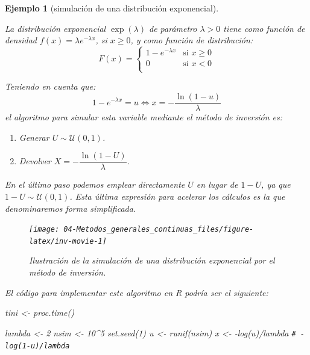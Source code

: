 \documentclass[
]{book}
\newenvironment{Shaded}{\begin{snugshade}}{\end{snugshade}}
\newcommand{\CommentTok}[1]{\textcolor[rgb]{0.56,0.35,0.01}{\textit{#1}}}
\newcommand{\DecValTok}[1]{\textcolor[rgb]{0.00,0.00,0.81}{#1}}
\newcommand{\FunctionTok}[1]{\textcolor[rgb]{0.00,0.00,0.00}{#1}}
\newcommand{\NormalTok}[1]{#1}
\newcommand{\OtherTok}[1]{\textcolor[rgb]{0.56,0.35,0.01}{#1}}
\newcommand{\SpecialCharTok}[1]{\textcolor[rgb]{0.00,0.00,0.00}{#1}}
\theoremstyle{break}
\newtheorem{example}{Ejemplo}[chapter]
\theoremstyle{nonumberplain}
\renewcommand{\CommentTok}[1]{\textcolor[rgb]{0.41,0.41,0.41}{\texttt{#1}}}
\begin{document}
\begin{example}[simulación de una distribución exponencial]
\protect\hypertarget{exm:exp-inv}{}\label{exm:exp-inv}

La distribución exponencial \(\exp \left( \lambda \right)\) de parámetro \(\lambda>0\)
tiene como función de densidad \(f(x) =\lambda e^{-\lambda x}\), si \(x\geq 0\),
y como función de distribución:
\[F(x)=\left\{ \begin{array}{ll}
1-e^{-\lambda x} & \text{si } x \ge 0 \\
0 & \text{si } x < 0\\
\end{array} \right.\]

Teniendo en cuenta que:
\[1-e^{-\lambda x}=u \Leftrightarrow x=-\frac{\ln \left( 1-u\right) }{ \lambda }\]
el algoritmo para simular esta variable mediante el método de inversión es:

\begin{enumerate}
\def\labelenumi{\arabic{enumi}.}
\item
  Generar \(U \sim \mathcal{U}(0, 1)\).
\item
  Devolver \(X=-\dfrac{\ln \left( 1-U\right) }{\lambda }\).
\end{enumerate}

En el último paso podemos emplear directamente \(U\) en lugar de \(1-U\), ya que \(1 - U \sim \mathcal{U}(0, 1)\).
Esta última expresión para acelerar los cálculos es la que denominaremos \emph{forma simplificada}.

\begin{figure}[!htb]

{\centering \texttt{[image: 04-Metodos\_generales\_continuas\_files/figure-latex/inv-movie-1]} 

}

\caption{Ilustración de la simulación de una distribución exponencial por el método de inversión.}\label{fig:inv-movie}
\end{figure}

El código para implementar este algoritmo en R podría ser el siguiente:

\begin{Shaded}
\begin{Highlighting}[]
\NormalTok{tini }\OtherTok{\textless{}{-}} \FunctionTok{proc.time}\NormalTok{()}

\NormalTok{lambda }\OtherTok{\textless{}{-}} \DecValTok{2}
\NormalTok{nsim }\OtherTok{\textless{}{-}} \DecValTok{10}\SpecialCharTok{\^{}}\DecValTok{5}
\FunctionTok{set.seed}\NormalTok{(}\DecValTok{1}\NormalTok{)}
\NormalTok{u }\OtherTok{\textless{}{-}} \FunctionTok{runif}\NormalTok{(nsim)}
\NormalTok{x }\OtherTok{\textless{}{-}} \SpecialCharTok{{-}}\FunctionTok{log}\NormalTok{(u)}\SpecialCharTok{/}\NormalTok{lambda }\CommentTok{\# {-}log(1{-}u)/lambda}


\end{Highlighting}
\end{Shaded}
\end{example}
\end{document}
